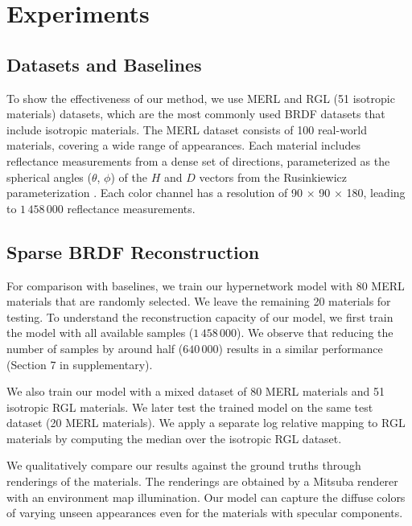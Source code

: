 \section{Experiments}\label{sec:exp}


\subsection{Datasets and Baselines}

To show the effectiveness of our method, we use MERL \cite{Matusik2003jul} and RGL (51 isotropic materials) \cite{dupuy2018adaptive} datasets, which are the most commonly used BRDF datasets that include isotropic materials. The MERL dataset \cite{Matusik2003jul} consists of 100 real-world materials, covering a wide range of appearances. Each material includes reflectance measurements from a dense set of directions, parameterized as the spherical angles ($\theta$, $\phi$) of the $H$ and $D$ vectors from the Rusinkiewicz parameterization \cite{rusinkiewicz1998new}. Each color channel has a resolution of 90 × 90 × 180, leading to $1\,458\,000$ reflectance measurements. 



\subsection{Sparse BRDF Reconstruction}\label{sec:brdf_rec}
 For comparison with baselines, we train our hypernetwork model with 80 MERL materials that are randomly selected. We leave the remaining 20 materials for testing. To understand the reconstruction capacity of our model, we first train the model with all available samples ($1\,458\,000$). We observe that reducing the number of samples by around half ($640\,000$) results in a similar performance (Section 7 in supplementary). 

We also train our model with a mixed dataset of 80 MERL materials and 51 isotropic RGL materials. We later test the trained model on the same test dataset (20 MERL materials). We apply a separate log relative mapping to RGL materials by computing the median over the isotropic RGL dataset.
 
 We qualitatively compare our results against the ground truths through renderings of the materials. The renderings are obtained by a Mitsuba renderer with an environment map illumination. Our model can capture the diffuse colors of varying unseen appearances even for the materials with specular components. 



